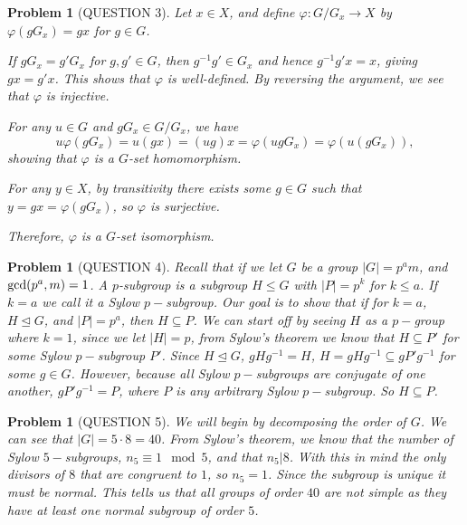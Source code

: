 \documentclass[titlepage]{article}
\theoremstyle{plain}
\newtheorem{problem}[theorem]{Problem}
\theoremstyle{definition}
\theoremstyle{remark}
\theoremstyle{exercise-style}
\numberwithin{equation}{section}
\numberwithin{theorem}{section}
\numberwithin{remark}{section}
\begin{document}
\begin{problem}[QUESTION 3]
    Let $x \in X$, and define $\varphi : G / G_x \to X$ by $\varphi(gG_x) = gx$ for $g \in G$.  
    
    If $gG_x = g'G_x$ for $g, g' \in G$, then $g^{-1}g' \in G_x$ and hence
    $g^{-1}g' x = x$, giving $gx = g'x$. This shows that $\varphi$ is well-defined.  
    By reversing the argument, we see that $\varphi$ is injective.
    
    For any $u \in G$ and $gG_x \in G / G_x$, we have
    \[
    u \varphi(gG_x) = u(gx) = (ug)x = \varphi(ugG_x) = \varphi(u(gG_x)),
    \]
    showing that $\varphi$ is a $G$-set homomorphism.
    
    For any $y \in X$, by transitivity there exists some $g \in G$ such that
    $y = gx = \varphi(gG_x)$, so $\varphi$ is surjective.
    
    Therefore, $\varphi$ is a $G$-set isomorphism.
\end{problem}

\begin{problem}[QUESTION 4]
    Recall that if we let $G$ be a group $|G| = p^am$, and $\textnormal{gcd}(p^a,m)=1$. A $p$-subgroup is a subgroup $H \leqslant G$ with $|P|=p^k$ for $k \leq a$. If $k = a$ we call it a Sylow $p-$subgroup. Our goal is to show that if for $k = a$, $H \trianglelefteq G$, and $|P|=p^a$, then $H \subseteq P$. We can start off by seeing $H$ as a $p-$group where $k=1$, since we let $|H|=p$, from Sylow's theorem we know that $H\subseteq P'$ for some Sylow $p-$subgroup $P'$. Since $H \trianglelefteq G$, $g H g^{-1}=H$, $H =gHg^{-1} \subseteq gP'g^{-1}$ for some $g \in G$. However, because all Sylow $p-$subgroups are conjugate of one another, $gP'g^{-1} = P$, where $P$ is any arbitrary Sylow $p-$subgroup. So $H \subseteq P$.
\end{problem}

\begin{problem}[QUESTION 5]
    We will begin by decomposing the order of $G$. We can see that $|G|=5\cdot 8 = 40$. From Sylow's theorem, we know that the number of Sylow $5-$subgroups, $n_5 \equiv 1 \mod 5$, and that $n_5|8$. With this in mind the only divisors of $8$ that are congruent to $1$, so $n_5 = 1$. Since the subgroup is unique it must be normal. This tells us that all groups of order $40$ are not simple as they have at least one normal subgroup of order $5$. 
\end{problem}
\end{document}
